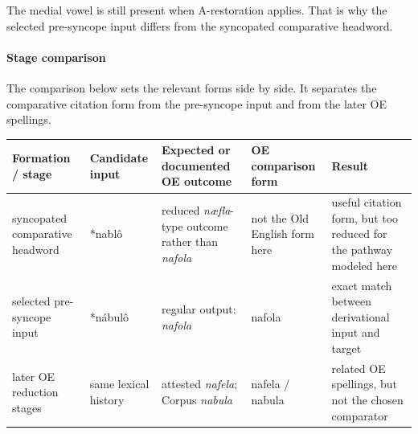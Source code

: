 \documentclass[
  british,
  a4paper,
]{article}
\newcounter{none} %
\begin{document}
The medial vowel is still present when A-restoration applies. That is
why the selected pre-syncope input differs from the syncopated
comparative headword.

\paragraph{Stage comparison}\label{stage-comparison}

The comparison below sets the relevant forms side by side. It separates
the comparative citation form from the pre-syncope input and from the
later OE spellings.

{\def\LTcaptype{none} %
\begin{longtable}[]{@{}
  >{\raggedright\arraybackslash}p{}
  >{\raggedright\arraybackslash}p{}
  >{\raggedright\arraybackslash}p{}
  >{\raggedright\arraybackslash}p{}
  >{\raggedright\arraybackslash}p{}@{}}
\toprule\noalign{}
\begin{minipage}[b]{\linewidth}\raggedright
Formation / stage
\end{minipage} & \begin{minipage}[b]{\linewidth}\raggedright
Candidate input
\end{minipage} & \begin{minipage}[b]{\linewidth}\raggedright
Expected or documented OE outcome
\end{minipage} & \begin{minipage}[b]{\linewidth}\raggedright
OE comparison form
\end{minipage} & \begin{minipage}[b]{\linewidth}\raggedright
Result
\end{minipage} \\
\midrule\noalign{}
\endhead
\bottomrule\noalign{}
\endlastfoot
syncopated comparative headword & *nablô & reduced \emph{næfla}-type
outcome rather than \emph{nafola} & not the Old English form here &
useful citation form, but too reduced for the pathway modeled here \\
selected pre-syncope input & *nábulô & regular output: \emph{nafola} &
nafola & exact match between derivational input and target \\
later OE reduction stages & same lexical history & attested
\emph{nafela}; Corpus \emph{nabula} & nafela / nabula & related OE
spellings, but not the chosen comparator \\
\end{longtable}
}
\end{document}
